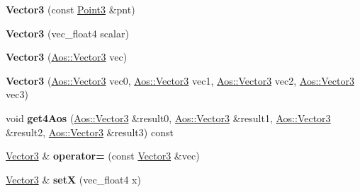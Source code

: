 \begin{DoxyCompactItemize}
\item 
\hypertarget{classVectormath_1_1Soa_1_1Vector3_adfa1eab885896c70eef4cc43d2b70976}{{\bfseries Vector3} (const \hyperlink{classVectormath_1_1Soa_1_1Point3}{Point3} \&pnt)}\label{classVectormath_1_1Soa_1_1Vector3_adfa1eab885896c70eef4cc43d2b70976}

\item 
\hypertarget{classVectormath_1_1Soa_1_1Vector3_a007123be368a50e520e8201e53b5f028}{{\bfseries Vector3} (vec\-\_\-float4 scalar)}\label{classVectormath_1_1Soa_1_1Vector3_a007123be368a50e520e8201e53b5f028}

\item 
\hypertarget{classVectormath_1_1Soa_1_1Vector3_a4bed8595f3c35e6cc85434308b6e7a11}{{\bfseries Vector3} (\hyperlink{classVectormath_1_1Aos_1_1Vector3}{Aos\-::\-Vector3} vec)}\label{classVectormath_1_1Soa_1_1Vector3_a4bed8595f3c35e6cc85434308b6e7a11}

\item 
\hypertarget{classVectormath_1_1Soa_1_1Vector3_a8745c2b774b896367f1344c002926a17}{{\bfseries Vector3} (\hyperlink{classVectormath_1_1Aos_1_1Vector3}{Aos\-::\-Vector3} vec0, \hyperlink{classVectormath_1_1Aos_1_1Vector3}{Aos\-::\-Vector3} vec1, \hyperlink{classVectormath_1_1Aos_1_1Vector3}{Aos\-::\-Vector3} vec2, \hyperlink{classVectormath_1_1Aos_1_1Vector3}{Aos\-::\-Vector3} vec3)}\label{classVectormath_1_1Soa_1_1Vector3_a8745c2b774b896367f1344c002926a17}

\item 
\hypertarget{classVectormath_1_1Soa_1_1Vector3_a324c1d0d4bb3d5d6e42ec7dde14363e1}{void {\bfseries get4\-Aos} (\hyperlink{classVectormath_1_1Aos_1_1Vector3}{Aos\-::\-Vector3} \&result0, \hyperlink{classVectormath_1_1Aos_1_1Vector3}{Aos\-::\-Vector3} \&result1, \hyperlink{classVectormath_1_1Aos_1_1Vector3}{Aos\-::\-Vector3} \&result2, \hyperlink{classVectormath_1_1Aos_1_1Vector3}{Aos\-::\-Vector3} \&result3) const }\label{classVectormath_1_1Soa_1_1Vector3_a324c1d0d4bb3d5d6e42ec7dde14363e1}

\item 
\hypertarget{classVectormath_1_1Soa_1_1Vector3_a39d3cbe6129d6f252d5074b4e7daa50a}{\hyperlink{classVectormath_1_1Soa_1_1Vector3}{Vector3} \& {\bfseries operator=} (const \hyperlink{classVectormath_1_1Soa_1_1Vector3}{Vector3} \&vec)}\label{classVectormath_1_1Soa_1_1Vector3_a39d3cbe6129d6f252d5074b4e7daa50a}

\item 
\hypertarget{classVectormath_1_1Soa_1_1Vector3_abb6e88df34d361535c9a1e234873df7b}{\hyperlink{classVectormath_1_1Soa_1_1Vector3}{Vector3} \& {\bfseries set\-X} (vec\-\_\-float4 x)}\label{classVectormath_1_1Soa_1_1Vector3_abb6e88df34d361535c9a1e234873df7b}


\end{DoxyCompactItemize}
